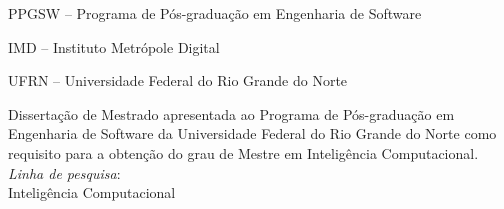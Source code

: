 
\instituicao
{
   PPGSW -- Programa de Pós-graduação em Engenharia de Software\par
   IMD -- Instituto Metrópole Digital\par
   UFRN -- Universidade Federal do Rio Grande do Norte
}
	
\comentario
{
	Dissertação de Mestrado apresentada ao Programa de Pós-graduação em Engenharia de Software da Universidade Federal do Rio Grande do Norte como requisito para a obtenção do grau de Mestre em Inteligência Computacional.\bigskip\\
   \textit{Linha de pesquisa}:\\ Inteligência Computacional %
}
		

\folhaderosto